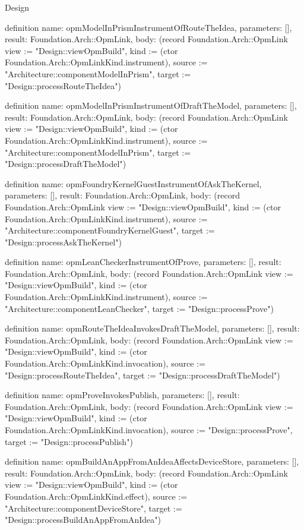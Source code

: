 \begin{lexlean}{Design}
\begin{semanticmodule}
definition{
  name: opmModelInPrismInstrumentOfRouteTheIdea,
  parameters: [],
  result: Foundation.Arch::OpmLink,
  body: (record Foundation.Arch::OpmLink {view := "Design::viewOpmBuild", kind := (ctor Foundation.Arch::OpmLinkKind.instrument), source := "Architecture::componentModelInPrism", target := "Design::processRouteTheIdea"})
}

definition{
  name: opmModelInPrismInstrumentOfDraftTheModel,
  parameters: [],
  result: Foundation.Arch::OpmLink,
  body: (record Foundation.Arch::OpmLink {view := "Design::viewOpmBuild", kind := (ctor Foundation.Arch::OpmLinkKind.instrument), source := "Architecture::componentModelInPrism", target := "Design::processDraftTheModel"})
}

definition{
  name: opmFoundryKernelGuestInstrumentOfAskTheKernel,
  parameters: [],
  result: Foundation.Arch::OpmLink,
  body: (record Foundation.Arch::OpmLink {view := "Design::viewOpmBuild", kind := (ctor Foundation.Arch::OpmLinkKind.instrument), source := "Architecture::componentFoundryKernelGuest", target := "Design::processAskTheKernel"})
}

definition{
  name: opmLeanCheckerInstrumentOfProve,
  parameters: [],
  result: Foundation.Arch::OpmLink,
  body: (record Foundation.Arch::OpmLink {view := "Design::viewOpmBuild", kind := (ctor Foundation.Arch::OpmLinkKind.instrument), source := "Architecture::componentLeanChecker", target := "Design::processProve"})
}

definition{
  name: opmRouteTheIdeaInvokesDraftTheModel,
  parameters: [],
  result: Foundation.Arch::OpmLink,
  body: (record Foundation.Arch::OpmLink {view := "Design::viewOpmBuild", kind := (ctor Foundation.Arch::OpmLinkKind.invocation), source := "Design::processRouteTheIdea", target := "Design::processDraftTheModel"})
}

definition{
  name: opmProveInvokesPublish,
  parameters: [],
  result: Foundation.Arch::OpmLink,
  body: (record Foundation.Arch::OpmLink {view := "Design::viewOpmBuild", kind := (ctor Foundation.Arch::OpmLinkKind.invocation), source := "Design::processProve", target := "Design::processPublish"})
}

definition{
  name: opmBuildAnAppFromAnIdeaAffectsDeviceStore,
  parameters: [],
  result: Foundation.Arch::OpmLink,
  body: (record Foundation.Arch::OpmLink {view := "Design::viewOpmBuild", kind := (ctor Foundation.Arch::OpmLinkKind.effect), source := "Architecture::componentDeviceStore", target := "Design::processBuildAnAppFromAnIdea"})
}


\end{semanticmodule}
\end{lexlean}
